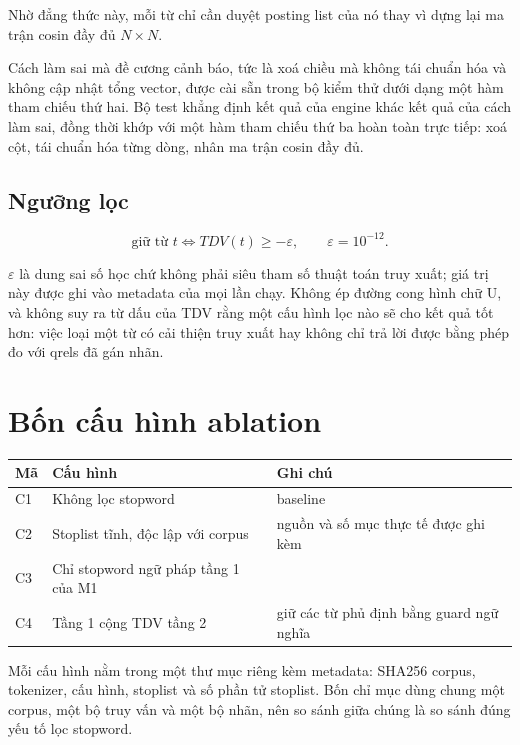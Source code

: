 Nhờ đẳng thức này, mỗi từ chỉ cần duyệt posting list của nó thay vì dựng lại ma
trận cosin đầy đủ $N\times N$.

Cách làm sai mà đề cương cảnh báo, tức là xoá chiều mà không tái chuẩn hóa và
không cập nhật tổng vector, được cài sẵn trong bộ kiểm thử dưới dạng một hàm tham
chiếu thứ hai. Bộ test khẳng định kết quả của engine khác kết quả của cách làm
sai, đồng thời khớp với một hàm tham chiếu thứ ba hoàn toàn trực tiếp: xoá cột,
tái chuẩn hóa từng dòng, nhân ma trận cosin đầy đủ.

\subsection{Ngưỡng lọc}

\begin{equation}
\text{giữ từ } t \iff TDV(t)\geq -\varepsilon,\qquad \varepsilon=10^{-12}.
\end{equation}

$\varepsilon$ là dung sai số học chứ không phải siêu tham số thuật toán truy xuất;
giá trị này được ghi vào metadata của mọi lần chạy. Không ép đường cong hình chữ
U, và không suy ra từ dấu của TDV rằng một cấu hình lọc nào sẽ cho kết quả tốt
hơn: việc loại một từ có cải thiện truy xuất hay không chỉ trả lời được bằng phép
đo với qrels đã gán nhãn.

\section{Bốn cấu hình ablation}

\begin{center}
\begin{tabular}{|l|l|l|}
\hline
Mã & Cấu hình & Ghi chú \\
\hline
C1 & Không lọc stopword & baseline \\
C2 & Stoplist tĩnh, độc lập với corpus & nguồn và số mục thực tế được ghi kèm \\
C3 & Chỉ stopword ngữ pháp tầng 1 của M1 & \\
C4 & Tầng 1 cộng TDV tầng 2 & giữ các từ phủ định bằng guard ngữ nghĩa \\
\hline
\end{tabular}
\end{center}

Mỗi cấu hình nằm trong một thư mục riêng kèm metadata: SHA256 corpus, tokenizer,
cấu hình, stoplist và số phần tử stoplist. Bốn chỉ mục dùng chung một corpus, một
bộ truy vấn và một bộ nhãn, nên so sánh giữa chúng là so sánh đúng yếu tố lọc
stopword.

